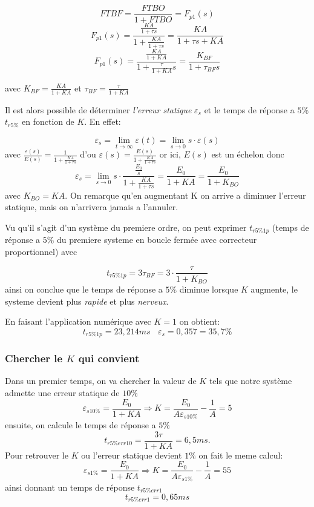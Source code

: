 \documentclass[12pt, a4paper]{report}
\begin{document}
\[
    FTBF = \frac{FTBO}{1 + FTBO} = F_{p1}(s)
\]
\[
    F_{p1}(s) = \frac{\frac{KA}{1 + \tau s}}{1 + \frac{KA}{1 + \tau s}} = \frac{KA}{1 + \tau s + KA}    
\]
\[
    F_{p1}(s) = \frac{\frac{KA}{1 + KA}}{1 + \frac{\tau}{1 + KA} s} = \frac{K_{BF}}{1 + \tau_{BF}s}
\]

avec $K_{BF} = \frac{KA}{1 + KA}$ et $\tau_{BF} = \frac{\tau}{1 + KA}$

Il est alors possible de déterminer \textit{l'erreur statique} $\varepsilon_s$ et le 
temps de réponse a $5\%$ $t_{r5\%}$ en fonction de $K$. En effet:

\[
    \varepsilon_s = \lim_{t \rightarrow \infty} \varepsilon(t) = \lim_{s \rightarrow 0} s\cdot \varepsilon(s)
\]
avec $\frac{\varepsilon(s)}{E(s)} = \frac{1}{1 + \frac{KA}{1 + \tau s}}$ d'ou $\varepsilon(s) = \frac{E(s)}{1 + \frac{KA}{1 + \tau s}}$ or ici, $E(s)$ est un échelon donc
\[
    \varepsilon_s = \lim_{s \rightarrow 0} s \cdot \frac{\frac{E_0}{s}}{1 + \frac{KA}{1 + \tau s}} = \frac{E_0}{1 + KA} = \frac{E_0}{1 + K_{BO}}
\]
avec $K_{BO} = KA$. On remarque qu'en augmentant K on arrive a diminuer l'erreur statique, mais 
on n'arrivera jamais a l'annuler.

Vu qu'il s'agit d'un système du premiere ordre, on peut exprimer $t_{r5\%1p}$ (temps de réponse a $5\%$ du premiere systeme en boucle fermée avec 
correcteur proportionnel) avec

\[
    t_{r5\%1p} = 3 \tau_{BF} = 3 \cdot \frac{\tau}{1 + K_{BO}}
\]
ainsi on conclue que le temps de réponse a $5\%$ diminue lorsque $K$ augmente, le systeme devient
plus \textit{rapide} et plus \textit{nerveux}.

En faisant l'application numérique avec $K = 1$ on obtient:
\[
    t_{r5\%1p} = 23,214ms \ \ \ \ \varepsilon_s = 0,357 = 35,7\%
\]

\subsubsection{Chercher le $K$ qui convient}
Dans un premier temps, on va chercher la valeur de $K$ tels que notre système admette une
erreur statique de $10\%$
\[
    \varepsilon_{s10\%} =  \frac{E_0}{1 + KA} \Rightarrow K = \frac{E_0}{A\varepsilon_{s10\%}} - \frac{1}{A} = 5
\]
ensuite, on calcule le temps de réponse a $5\%$ 
\[
    t_{r5\%err10} = \frac{3 \tau}{1 + KA} = 6,5ms.
\]
Pour retrouver le $K$ ou l'erreur statique devient $1\%$ on fait le meme calcul:
\[
    \varepsilon_{s1\%} =  \frac{E_0}{1 + KA} \Rightarrow K = \frac{E_0}{A\varepsilon_{s1\%}} - \frac{1}{A} = 55
\]
ainsi donnant un temps de réponse $t_{r5\%err1}$
\[
    t_{r5\%err1} = 0,65ms
\]
\end{document}
